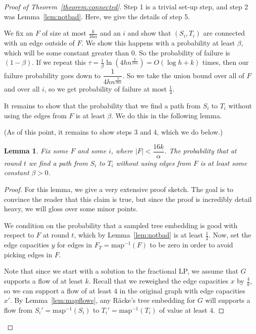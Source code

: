 \documentclass[12pt]{article}
\newtheorem{lemma}{Lemma}
\begin{document}
\begin{proof}[Proof of Theorem~\ref{theorem:connected}]

Step 1 is a trivial set-up step, and step 2 was Lemma~\ref{lem:notbad}. Here, we give the details of step 5.

We fix an $F$ of size at most $\frac{k}{16\alpha}$ and an $i$ and show that $(S_i, T_i)$ are connected with an edge outside of $F$. We show this happens with a probability at least $\beta$, which will be some constant greater than 0. So the probability of failure is $(1-\beta)$. If we repeat this $\tau = \frac{1}{\beta}\ln(4hn^{\frac{k}{16\alpha}}) = O(\log h + k)$ times, then our failure probability goes down to $\dfrac{1}{4hn^{\frac{k}{16\alpha}}}$. So we take the union bound over all of $F$ and over all $i$, so we get probability of failure at most $\frac{1}{4}$.

It remains to show that the probability that we find a path from $S_i$ to $T_i$ without using the edges from $F$ is at least $\beta$. We do this in the following lemma.

(As of this point, it remains to show steps 3 and 4, which we do below.)

\begin{lemma}
Fix some $F$ and some $i$, where $|F| < \dfrac{16k}{\alpha}$. The probability that at round $t$ we find a path from $S_i$ to $T_i$ without using edges from $F$ is at least some constant $\beta > 0$. 
\end{lemma}

\begin{proof}

For this lemma, we give a very extensive proof sketch. The goal is to convince the reader that this claim is true, but since the proof is incredibly detail heavy, we will gloss over some minor points.

We condition on the probability that a sampled tree embedding is good with respect to $F$ at round $t$, which by Lemma~\ref{lem:notbad} is at least $\frac{1}{2}$. Now, set the edge capacities $y$ for edges in $F_T = \text{map}^{-1}(F)$ to be zero in order to avoid picking edges in $F$. 

Note that since we start with a solution to the fractional LP, we assume that $G$ supports a flow of at least $k$. Recall that we reweighed the edge capacities $x$ by $\frac{4}{k}$, so we can support a flow of at least $4$ in the original graph with edge capacities $x'$. By Lemma~\ref{lem:mapflows}, any R\"{a}cke's tree embedding for $G$ will supports a flow from $S_i' = \text{map}^{-1}(S_i)$ to $T_i' = \text{map}^{-1}(T_i)$ of value at least $4$. 


\end{proof}
\end{proof}
\end{document}
